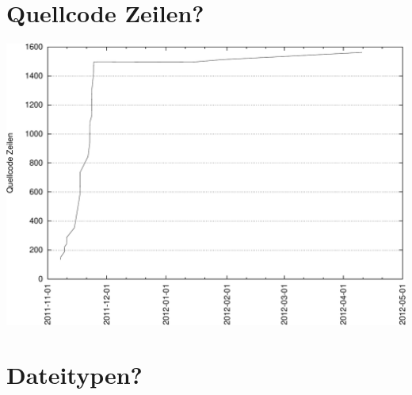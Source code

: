 \documentclass[12pt,a4paper,ngerman]{scrartcl}
\begin{document}
\section*{Quellcode Zeilen?}%
\includegraphics[width=14cm]{stats/lines_of_code-crop}%

\section*{Dateitypen?}%
\begin{center}%
\end{center}%
\end{document}
